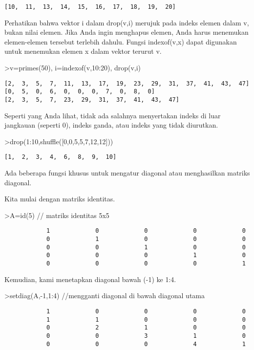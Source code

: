 \documentclass[
]{book}
\begin{document}
\begin{verbatim}
[10,  11,  13,  14,  15,  16,  17,  18,  19,  20]
\end{verbatim}

Perhatikan bahwa vektor i dalam drop(v,i) merujuk pada indeks elemen dalam v, bukan nilai elemen. Jika Anda ingin menghapus elemen, Anda harus menemukan elemen-elemen tersebut terlebih dahulu. Fungsi indexof(v,x) dapat digunakan untuk menemukan elemen x dalam vektor terurut v.

\textgreater v=primes(50), i=indexof(v,10:20), drop(v,i)

\begin{verbatim}
[2,  3,  5,  7,  11,  13,  17,  19,  23,  29,  31,  37,  41,  43,  47]
[0,  5,  0,  6,  0,  0,  0,  7,  0,  8,  0]
[2,  3,  5,  7,  23,  29,  31,  37,  41,  43,  47]
\end{verbatim}

Seperti yang Anda lihat, tidak ada salahnya menyertakan indeks di luar jangkauan (seperti 0), indeks ganda, atau indeks yang tidak diurutkan.

\textgreater drop(1:10,shuffle({[}0,0,5,5,7,12,12{]}))

\begin{verbatim}
[1,  2,  3,  4,  6,  8,  9,  10]
\end{verbatim}

Ada beberapa fungsi khusus untuk mengatur diagonal atau menghasilkan matriks diagonal.

Kita mulai dengan matriks identitas.

\textgreater A=id(5) // matriks identitas 5x5

\begin{verbatim}
            1             0             0             0             0 
            0             1             0             0             0 
            0             0             1             0             0 
            0             0             0             1             0 
            0             0             0             0             1 
\end{verbatim}

Kemudian, kami menetapkan diagonal bawah (-1) ke 1:4.

\textgreater setdiag(A,-1,1:4) //mengganti diagonal di bawah diagonal utama

\begin{verbatim}
            1             0             0             0             0 
            1             1             0             0             0 
            0             2             1             0             0 
            0             0             3             1             0 
            0             0             0             4             1 
\end{verbatim}
\end{document}

